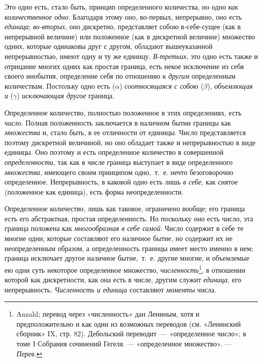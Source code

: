 {Это одно есть, стало быть, принцип определенного количества, но одно
{\em как количественное одно}. Благодаря этому оно,
во-первых, непрерывно, оно есть {\em единица};
{\em во-вторых}, оно дискретно, представляет собою
в-себе-сущее (как в непрерывной величине) или положенное (как в дискретной
величине) множество одних, которые одинаковы друг с другом, обладают
вышеуказанной непрерывностью, имеют одну и ту же единицу.
{\em В-третьих}, это одно есть также и отрицание многих
одних как простая граница, есть некое исключение из себя своего инобытия,
определение себя по отношению к {\em другим}
определенным количествам. Постольку одно есть ($\alpha $)
{\em соотносящаяся с собою} ($\beta $),
{\em объемлющая и} ($\gamma $)
{\em исключающая другое} граница.

Определенное количество, полностью положенное в этих определениях, есть
{\em число}. Полная положенность заключается в наличном
бытии границы как {\em множества} и, стало быть, в ее
отличности от единицы. Число представляется поэтому дискретной величиной,
но оно обладает также и непрерывностью в виде единицы. Оно поэтому и есть
определенное количество в совершенной
{\em определенности}, так как в числе граница выступает
в виде определенного {\em множества}, имеющего своим
принципом одно,~т.~е. нечто безоговорочно определенное. Непрерывность, в
каковой одно есть лишь {\em в себе}, как снятое
(положенное как единица), есть форма неопределенности.

Определенное количество, лишь как таковое, ограничено вообще; его граница
есть его абстрактная, простая определенность. Но поскольку оно есть число,
эта граница положена как {\em многообразная в себе
самой}. Число содержит в себе те многие одни, которые составляют его
наличное бытие, но содержит их не неопределенным образом, а определенность
границы имеет место именно в нем; граница исключает другое наличное
бытие,~т.~е. другие многие, и объемлемые ею одни суть некоторое
определенное множество,
{\em численность}\footnote{Anzahl; перевод через «численность» дан Лениным, хотя и
предположительно и как один из возможных переводов (см. «Ленинский сборник»
IX, стр. 82). Дебольский переводит —~«определенное число»; в
томе I Собрания сочинений Гегеля. — «определенное
множество». — {\em Перев}.}, в отношении которой как
дискретности, как она есть в числе, другим служит
{\em единица}, его непрерывность.
{\em Численность и единица} составляют
{\em моменты} числа.

}
